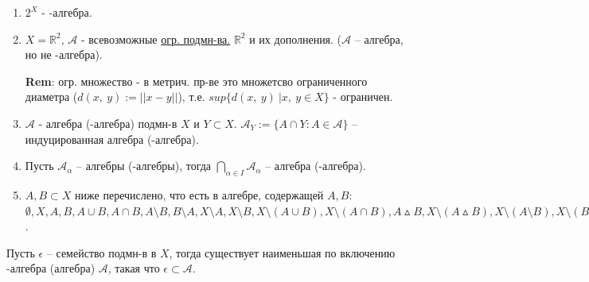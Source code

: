 \begin{example}
    \begin{enumerate}
        \item $2^X$ - \sigma-алгебра.
        
        \item $X = \mathbb{R}^2$, $\mathcal{A}$ - всевозможные \href{https://ru.wikipedia.org/wiki/%D0%9E%D0%B3%D1%80%D0%B0%D0%BD%D0%B8%D1%87%D0%B5%D0%BD%D0%BD%D0%BE%D1%81%D1%82%D1%8C}{огр. подмн-ва.} $\mathbb{R}^2$ и их дополнения. ($\mathcal{A}$ -- алгебра, но не \sigma-алгебра).
        
        \textbf{Rem}: огр. множество - в метрич. пр-ве это множетсво ограниченного диаметра ($d(x, \ y) := || x - y ||$), т.е. $sup\{ d(x, \ y) \ | x, \ y \in X \}$ - ограничен.

        \item $\mathcal{A}$ - алгебра (\sigma-алгебра) подмн-в $X$ и $Y \subset X$. $\mathcal{A}_{Y} := \{A \cap Y : A \in \mathcal{A}\}$ -- индуцированная алгебра (\sigma-алгебра).
        
        \item Пусть $\mathcal{A}_{\alpha}$ -- алгебры (\sigma-алгебры), тогда $\bigcap_{\alpha \in I}\mathcal{A}_{\alpha}$ -- алгебра (\sigma-алгебра).
        
        \item $A, B \subset X$ ниже перечислено, что есть в алгебре, содержащей $A, B$: \\ $\emptyset, X, A, B, A \cup B, A \cap B, A \setminus B, B \setminus A, X \setminus A, X \setminus B, X \setminus (A \cup B), X \setminus (A \cap B), A \vartriangle B, X \setminus (A \vartriangle B), X \setminus (A \setminus B), X \setminus (B \setminus A)$.
    \end{enumerate}
\end{example}

\begin{theorem}
    Пусть $\epsilon$ -- семейство подмн-в в $X$, тогда существует наименьшая по включению \sigma-алгебра (алгебра) $\mathcal{A}$, такая что $\epsilon \subset \mathcal{A}$.
\end{theorem}

